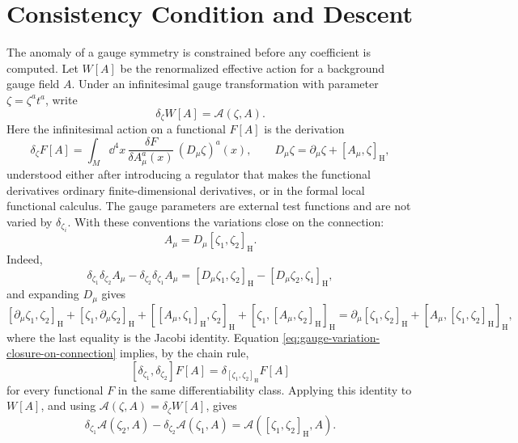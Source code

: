 \section{Consistency Condition and Descent}

The anomaly of a gauge symmetry is constrained before any coefficient is
computed.  Let \(W[A]\) be the renormalized effective action for a background
gauge field \(A\).  Under an infinitesimal gauge transformation with parameter
\(\zeta=\zeta^a t^a\), write
\[
  \delta_\zeta W[A]=\mathcal A(\zeta,A).
\]
Here the infinitesimal action on a functional \(F[A]\) is the derivation
\begin{equation}
  \delta_\zeta F[A]
  =
  \int_M \dd^4x\,
  \frac{\delta F}{\delta A_\mu^a(x)}
  \,(D_\mu\zeta)^a(x),
  \qquad
  D_\mu\zeta=\partial_\mu\zeta+[A_\mu,\zeta]_{\mathrm H},
  \label{eq:gauge-variation-functional-derivation}
\end{equation}
understood either after introducing a regulator that makes the functional
derivatives ordinary finite-dimensional derivatives, or in the formal local
functional calculus.  The gauge parameters are external test functions and
are not varied by \(\delta_{\zeta_i}\).  With these conventions the
variations close on the connection:
\begin{equation}
  [\delta_{\zeta_1},\delta_{\zeta_2}]A_\mu
  =
  D_\mu[\zeta_1,\zeta_2]_{\mathrm H}.
  \label{eq:gauge-variation-closure-on-connection}
\end{equation}
Indeed,
\[
  \delta_{\zeta_1}\delta_{\zeta_2}A_\mu
  -
  \delta_{\zeta_2}\delta_{\zeta_1}A_\mu
  =
  [D_\mu\zeta_1,\zeta_2]_{\mathrm H}
  -
  [D_\mu\zeta_2,\zeta_1]_{\mathrm H},
\]
and expanding \(D_\mu\) gives
\[
  [\partial_\mu\zeta_1,\zeta_2]_{\mathrm H}
  +
  [\zeta_1,\partial_\mu\zeta_2]_{\mathrm H}
  +
  [[A_\mu,\zeta_1]_{\mathrm H},\zeta_2]_{\mathrm H}
  +
  [\zeta_1,[A_\mu,\zeta_2]_{\mathrm H}]_{\mathrm H}
  =
  \partial_\mu[\zeta_1,\zeta_2]_{\mathrm H}
  +[A_\mu,[\zeta_1,\zeta_2]_{\mathrm H}]_{\mathrm H},
\]
where the last equality is the Jacobi identity.  Equation
\eqref{eq:gauge-variation-closure-on-connection} implies, by the chain rule,
\[
  [\delta_{\zeta_1},\delta_{\zeta_2}]F[A]
  =
  \delta_{[\zeta_1,\zeta_2]_{\mathrm H}}F[A]
\]
for every functional \(F\) in the same differentiability class.
Applying this identity to \(W[A]\), and using
\(\mathcal A(\zeta,A)=\delta_\zeta W[A]\), gives
\begin{equation}
  \delta_{\zeta_1}\mathcal A(\zeta_2,A)
  -
  \delta_{\zeta_2}\mathcal A(\zeta_1,A)
  =
  \mathcal A([\zeta_1,\zeta_2]_{\mathrm H},A).
  \label{eq:wess-zumino-consistency}
\end{equation}
